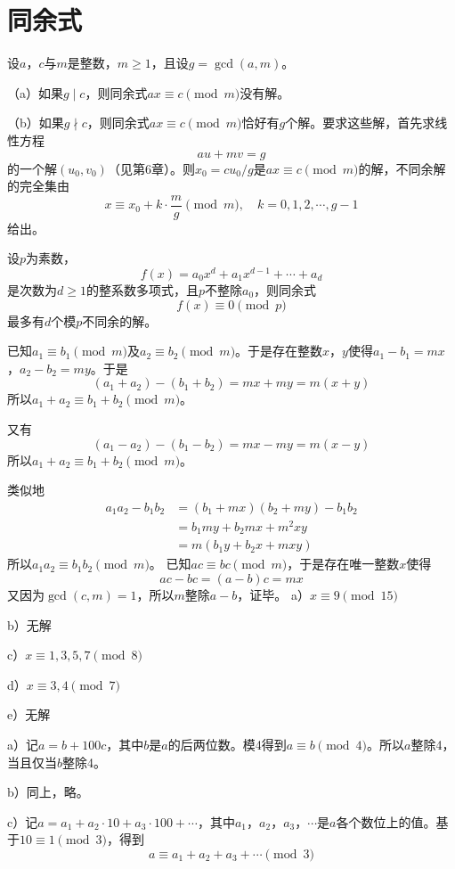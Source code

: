 \chapter{同余式}
\begin{theorem}[线性同余定理]
设$a$，$c$与$m$是整数，$m\ge1$，且设$g=\gcd(a,m)$。\par
（a）如果$g\mid c$，则同余式$ax\equiv c\pmod m$没有解。\par
（b）如果$g\nmid c$，则同余式$ax\equiv c\pmod m$恰好有$g$个解。要求这些解，首先求线性方程
\[au+mv=g\]
的一个解$(u_0,v_0)$（见第6章）。则$x_0=cu_0/g$是$ax\equiv c\pmod m$的解，不同余解的完全集由
\[x\equiv x_0+k\cdot\frac{m}{g}\pmod m,\quad k=0,1,2,\cdots,g-1\]
给出。
\end{theorem}
\begin{theorem}[模$p$多项式根定理]
设$p$为素数，
\[f(x)=a_0x^d+a_1x^{d-1}+\cdots+a_d\]
是次数为$d\ge 1$的整系数多项式，且$p$不整除$a_0$，则同余式
\[f(x)\equiv 0\pmod p\]
最多有$d$个模$p$不同余的解。
\end{theorem}
%
\exercise 已知$a_1\equiv b_1\pmod m$及$a_2\equiv b_2\pmod m$。于是存在整数$x$，$y$使得$a_1 - b_1 = mx$，$a_2 - b_2 = my$。于是
\[(a_1+a_2) - (b_1 + b_2) = mx + my = m(x+y)\]
所以$a_1+a_2\equiv b_1+b_2\pmod m$。\par
又有
\[(a_1-a_2) - (b_1 - b_2) = mx - my = m(x-y)\]
所以$a_1+a_2\equiv b_1+b_2\pmod m$。\par
类似地
\begin{align*}
a_1a_2 - b_1b_2 &= (b_1+mx)(b_2+my) - b_1b_2 \\
&= b_1my + b_2mx +m^2xy \\
&= m(b_1y+b_2x +mxy)
\end{align*}
所以$a_1a_2\equiv b_1b_2\pmod m$。
%
\exercise 已知$ac\equiv bc\pmod m$，于是存在唯一整数$x$使得
\[ac - bc = (a-b)c= mx\]
又因为$\gcd(c, m) = 1$，所以$m$整除$a-b$，证毕。
%
\exercise a）$x\equiv 9\pmod {15}$\par
b）无解\par
c）$x\equiv 1,3,5,7\pmod 8$\par
d）$x\equiv 3,4\pmod 7$\par
e）无解\par
%
\exercise a）记$a=b+100c$，其中$b$是$a$的后两位数。模4得到$a\equiv b\pmod4$。所以$a$整除4，当且仅当$b$整除4。\par
b）同上，略。\par
c）记$a=a_1+a_2\cdot10+a_3\cdot100+\cdots$，其中$a_1$，$a_2$，$a_3$，$\cdots$是$a$各个数位上的值。基于$10\equiv 1\pmod3$，得到
\[a\equiv a_1+a_2+a_3+\cdots\pmod3\]
